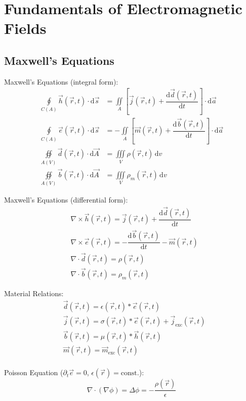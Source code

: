
\section{Fundamentals of Electromagnetic Fields}
\subsection{Maxwell's Equations}
Maxwell's Equations (integral form):
\begin{align*}
  \oint\limits_{C(A)} \vec{h}(\vec{r}, t)\cdot\mathrm{d}\vec{s}
  &= \iint\limits_{A}\left[ \vec{j}(\vec{r}, t) + \dfrac{\mathrm{d}\vec{d}(\vec{r}, t)}{\mathrm{d}t} \right]\cdot\mathrm{d}\vec{a}\\
  \oint\limits_{C(A)} \vec{e}(\vec{r}, t)\cdot\mathrm{d}\vec{s}
  &= -\iint\limits_{A}\left[ \vec{m}(\vec{r}, t) + \dfrac{\mathrm{d}\vec{b}(\vec{r}, t)}{\mathrm{d}t} \right]\cdot\mathrm{d}\vec{a}\\
  \oiint\limits_{A(V)}\vec{d}(\vec{r}, t)\cdot\mathrm{d}\vec{A} &= \iiint\limits_{V}\rho(\vec{r},t)\,\mathrm{d}v\\
  \oiint\limits_{A(V)}\vec{b}(\vec{r}, t)\cdot\mathrm{d}\vec{A} &= \iiint\limits_{V}\rho_{m}(\vec{r},t)\,\mathrm{d}v
\end{align*}

Maxwell's Equations (differential form):
\begin{align*}
&\nabla\times\vec{h}(\vec{r}, t) = \vec{j}(\vec{r},t) + \dfrac{\mathrm{d}\vec{d}(\vec{r},t)}{\mathrm{d}t}\\
&\nabla\times\vec{e}(\vec{r}, t) = -\dfrac{\mathrm{d}\vec{b}(\vec{r},t)}{\mathrm{d}t} -\vec{m}(\vec{r},t)\\
&\nabla\cdot\vec{d}(\vec{r},t) = \rho(\vec{r},t)\\
&\nabla\cdot\vec{b}(\vec{r},t) = \rho_{m}(\vec{r},t)
\end{align*}

Material Relations:
\begin{align*}
&\vec{d}(\vec{r},t) = \epsilon(\vec{r},t) * \vec{e}(\vec{r},t)\\
&\vec{j}(\vec{r},t) = \sigma(\vec{r},t) * \vec{e}(\vec{r},t) + \vec{j}_{\mathrm{exc}}(\vec{r},t)\\
&\vec{b}(\vec{r},t) = \mu(\vec{r},t) * \vec{h}(\vec{r},t)\\
&\vec{m}(\vec{r},t) = \vec{m}_{\mathrm{exc}}(\vec{r},t)\\
\end{align*}

Poisson Equation ($\partial_{t}\vec{e} = 0$, $\epsilon(\vec{r}) = \mathrm{const.}$):
\begin{equation*}
\nabla\cdot\left(\nabla\phi\right) = \Delta\phi = -\dfrac{\rho(\vec{r})}{\epsilon}
\end{equation*}

